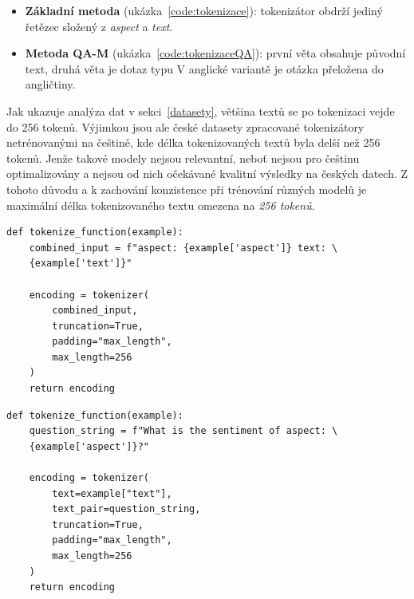 \begin{itemize}
    \item \textbf{Základní metoda} (ukázka~\ref{code:tokenizace}): tokenizátor obdrží jediný řetězec složený z \emph{aspect} a \emph{text}.  
    \item \textbf{Metoda QA-M} (ukázka~\ref{code:tokenizaceQA}): první věta obsahuje původní text, druhá věta je dotaz typu  V anglické variantě je otázka přeložena do angličtiny.
\end{itemize}

Jak ukazuje analýza dat v sekci~\ref{datasety}, většina textů se po tokenizaci vejde do 256 tokenů. Výjimkou jsou ale české datasety zpracované tokenizátory netrénovanými na češtině, kde délka tokenizovaných textů byla delší než 256 tokenů. Jenže takové modely nejsou relevantní, neboť nejsou pro češtinu optimalizovány a nejsou od nich očekávané kvalitní výsledky na českých datech. Z tohoto důvodu a k zachování konzistence při trénování různých modelů je maximální délka tokenizovaného textu omezena na \emph{256 tokenů}. 

\begin{listing}[ht]
\centering
\begin{verbatim}
def tokenize_function(example):
    combined_input = f"aspect: {example['aspect']} text: \
    {example['text']}"

    encoding = tokenizer(
        combined_input,
        truncation=True,
        padding="max_length",
        max_length=256
    )
    return encoding
\end{verbatim}
\caption[Ukázka funkce tokenizace u základní metody]%
{Ukázka funkce tokenizace u základní metody, vlastní práce}
\label{code:tokenizace}
\end{listing}

\begin{listing}[ht]
\centering
\begin{verbatim}
def tokenize_function(example):
    question_string = f"What is the sentiment of aspect: \
    {example['aspect']}?"

    encoding = tokenizer(
        text=example["text"],
        text_pair=question_string,
        truncation=True,
        padding="max_length",
        max_length=256
    )
    return encoding
\end{verbatim}
\caption[Ukázka funkce tokenizace u metody QA-M]%
{Ukázka funkce tokenizace u metody QA-M, vlastní práce}
\label{code:tokenizaceQA}
\end{listing}

